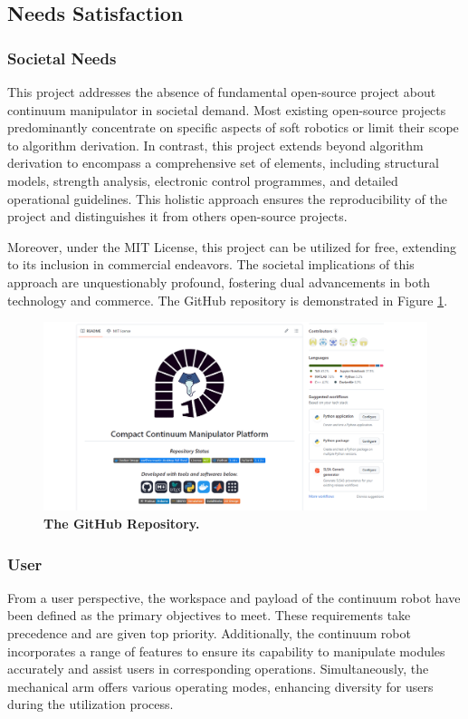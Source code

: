 \subsection{Needs Satisfaction}
\subsubsection{Societal Needs}
This project addresses the absence of fundamental open-source project about continuum manipulator in societal demand. 
Most existing open-source projects predominantly concentrate on specific aspects of soft robotics or limit their scope 
to algorithm derivation. In contrast, this project extends beyond algorithm derivation to encompass a comprehensive 
set of elements, including structural models, strength analysis, electronic control programmes, and detailed operational 
guidelines. This holistic approach ensures the reproducibility of the project and distinguishes it from others open-source 
projects. 

Moreover, under the MIT License, this project can be utilized for free, extending to its inclusion in commercial endeavors. 
The societal implications of this approach are unquestionably profound, fostering dual advancements in both technology and commerce.
The GitHub repository is demonstrated in Figure \ref{fig:github}.
\begin{figure}[H] %
    \centering 
    \captionsetup{labelsep=colon}
    \includegraphics[width=\textwidth]{Image/Result/github.png} 
    \caption[The GitHub Repository]
    {\centering \textbf{The GitHub Repository.}}
    \label{fig:github}
\end{figure}
\vspace{-5mm}

\subsubsection{User}
From a user perspective, the workspace and payload of the continuum robot have been defined as the primary objectives to meet. 
These requirements take precedence and are given top priority. Additionally, the continuum robot incorporates a range of 
features to ensure its capability to manipulate modules accurately and assist users in corresponding operations. Simultaneously, 
the mechanical arm offers various operating modes, enhancing diversity for users during the utilization process.



\newpage